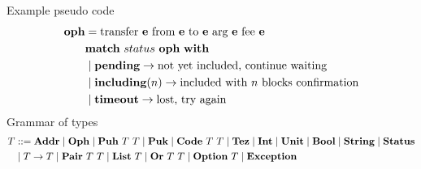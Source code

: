 \documentclass[a4paper]{llncs}
\begin{document}
Example pseudo code
\begin{align*}
  \OPH &=  \TRANSFER[\EXPR]\EXPR\EXPR\EXPR\EXPR \\
       & \MATCH\ {status\ \OPH}\ \WITH \\
       & \mid \STATUSPENDING \to \textrm{not yet included, continue waiting} \\
       & \mid \STATUSINCLUDING (n) \to \textrm{included with $n$
         blocks confirmation}\\
       & \mid \STATUSTIMEOUT \to \textrm{lost, try again}
\end{align*}
Grammar of types
\begin{align*}
  \TYPE & ::= \TADDR \mid \TOPH \mid \TPUH\ \TYPE\ \TYPE \mid \TPUK \mid \TCODE\
          \TYPE\ \TYPE \mid \TTEZ \mid
          \TINT \mid \TUNIT \mid \TBOOL \mid \TSTRING \mid \TSTATUS \\
  & \mid \TYPE\to\TYPE \mid \TPAIR\ \TYPE\ \TYPE \mid \TLIST\ \TYPE
    \mid \TSUM\ \TYPE\ \TYPE \mid \TOPTION\ \TYPE \mid \TEXCEPTION
\end{align*}
\end{document}
